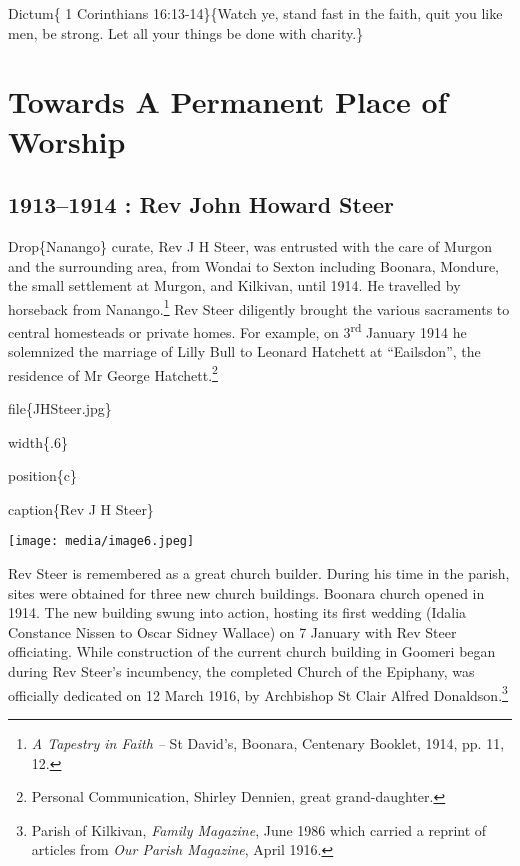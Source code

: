Dictum\{ 1 Corinthians 16:13-14\}\{Watch ye, stand fast in the faith, quit you like men, be strong. Let all your things be done with charity.\}

\hypertarget{towards-a-permanent-place-of-worship}{%
\chapter{Towards A Permanent Place of Worship}\label{towards-a-permanent-place-of-worship}}

\hypertarget{rev-john-howard-steer}{%
\section{1913--1914 : Rev John Howard Steer}\label{rev-john-howard-steer}}

Drop\{Nanango\} curate, Rev J H Steer, was entrusted with the care of Murgon and the surrounding area, from Wondai to Sexton including Boonara, Mondure, the small settlement at Murgon, and Kilkivan, until 1914. He travelled by horseback from Nanango.\footnote{\emph{A Tapestry in Faith --} St David's, Boonara, Centenary Booklet, 1914, pp. 11, 12.} Rev Steer diligently brought the various sacraments to central homesteads or private homes. For example, on 3\textsuperscript{rd} January 1914 he solemnized the marriage of Lilly Bull to Leonard Hatchett at ``Eailsdon'', the residence of Mr George Hatchett.\footnote{Personal Communication, Shirley Dennien, great grand-daughter.}

file\{JHSteer.jpg\}

width\{.6\}

position\{c\}

caption\{Rev J H Steer\}

\texttt{[image: media/image6.jpeg]}

Rev Steer is remembered as a great church builder. During his time in the parish, sites were obtained for three new church buildings. Boonara church opened in 1914. The new building swung into action, hosting its first wedding (Idalia Constance Nissen to Oscar Sidney Wallace) on 7 January with Rev Steer officiating. While construction of the current church building in Goomeri began during Rev Steer's incumbency, the completed Church of the Epiphany, was officially dedicated on 12 March 1916, by Archbishop St Clair Alfred Donaldson.\footnote{Parish of Kilkivan, \emph{Family Magazine}, June 1986 which carried a reprint of articles from \emph{Our Parish Magazine}, April 1916.}

